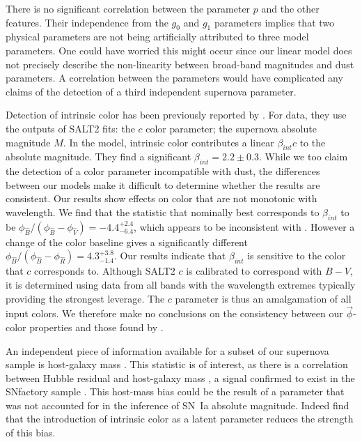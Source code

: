 \documentclass[trackchanges]{aastex62}   	%
\begin{document}
There is no significant correlation between the parameter $p$ and the other features.
Their independence from the  $g_0$ and $g_1$ parameters
implies that two physical parameters are not being artificially attributed to three
model parameters.  One could have
worried this might
occur since our linear model does not precisely
describe the non-linearity between broad-band magnitudes and dust parameters. A
correlation 
between the parameters would have complicated any claims of the detection of a third independent supernova parameter.

Detection of intrinsic color has been previously reported by .
For data, they use the outputs of SALT2 fits: the $c$ color parameter;
the
supernova absolute magnitude $M$.
In the 
model, intrinsic color contributes a linear   $\beta_{\mathit{int}} c$ to  the absolute
magnitude.
They find a significant $\beta_{\mathit{int}} = 2.2\pm 0.3$.
While we too claim the detection of a color parameter incompatible with dust,
the differences between our models make it
difficult to determine whether the results are consistent.   Our results show effects on color that are not monotonic
with wavelength.  We find that the statistic that nominally best corresponds to  $\beta_{\mathit{int}}$
to be
$\phi_{\hat{B}}/(\phi_{\hat{B}}-\phi_{\hat{V}}) =-4.4_{  -6.4}^{+   2.4}$, which appears to be inconsistent with  .  
However a change of the color baseline gives a significantly different
$\phi_{\hat{B}}/(\phi_{\hat{B}}-\phi_{\hat{R}}) =4.3_{  -1.4}^{+   3.8}$.  Our results indicate that  $\beta_{\mathit{int}}$
is sensitive to the color that $c$ corresponds to.  Although SALT2 $c$ is calibrated to correspond with $B-V$, it is
determined using data from all bands with the wavelength extremes  typically providing the strongest leverage.
The $c$ parameter is thus an  amalgamation of all input colors.
We therefore make no conclusions on the consistency between our $\vec{\phi}$-color properties
and those found by .


An independent piece of information available for a subset of our supernova sample is host-galaxy mass \citep{2013ApJ...770..108C}.  
This statistic is of interest, as there is a correlation between Hubble residual and host-galaxy mass
\citep[first noted by][]{2010ApJ...715..743K,2010MNRAS.406..782S}, a signal confirmed to exist in the SNfactory
sample \citep{2013ApJ...770..108C}.
This host-mass bias could be the result of a parameter that was not accounted for in the inference of SN~Ia absolute magnitude.
Indeed   find that the  introduction of intrinsic color as a latent parameter
reduces the strength of  this bias.
\end{document}

